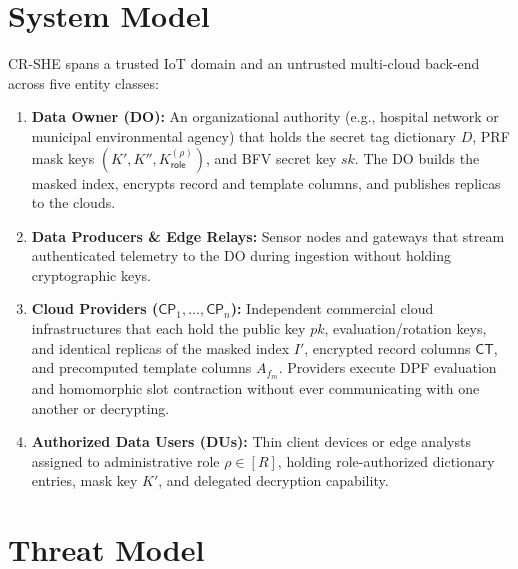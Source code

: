 \documentclass[11pt,a4paper]{article}
\begin{document}
\section{System Model}\label{sec:sysmodel}

CR-SHE spans a trusted IoT domain and an untrusted multi-cloud back-end across five entity classes:
\begin{enumerate}\setlength{\itemsep}{2pt}\setlength{\parskip}{0pt}
    \item \textbf{Data Owner (DO):} An organizational authority (e.g., hospital network or municipal environmental agency) that holds the secret tag dictionary $D$, PRF mask keys $(K', K'', K_{\mathsf{role}}^{(\rho)})$, and BFV secret key $sk$. The DO builds the masked index, encrypts record and template columns, and publishes replicas to the clouds.
    \item \textbf{Data Producers \& Edge Relays:} Sensor nodes and gateways that stream authenticated telemetry to the DO during ingestion without holding cryptographic keys.
    \item \textbf{Cloud Providers ($\mathsf{CP}_1, \dots, \mathsf{CP}_n$):} Independent commercial cloud infrastructures that each hold the public key $pk$, evaluation/rotation keys, and identical replicas of the masked index $I'$, encrypted record columns $\mathsf{CT}$, and precomputed template columns $A_{f_m}$. Providers execute DPF evaluation and homomorphic slot contraction without ever communicating with one another or decrypting.
    \item \textbf{Authorized Data Users (DUs):} Thin client devices or edge analysts assigned to administrative role $\rho \in [R]$, holding role-authorized dictionary entries, mask key $K'$, and delegated decryption capability.
\end{enumerate}

\section{Threat Model}\label{sec:threat}
\end{document}
